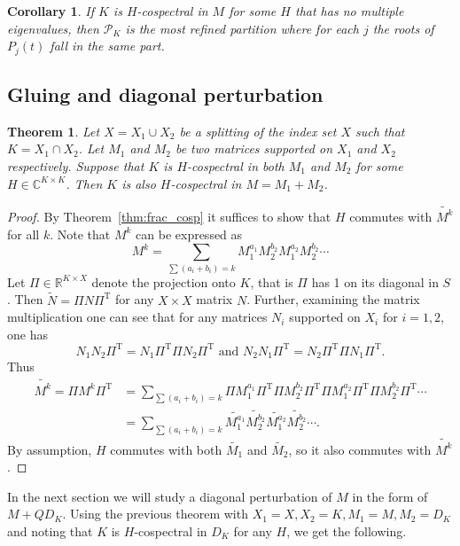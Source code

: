 \documentclass[11pt]{article}
\newtheorem{theorem}[theo]{Theorem}
\newtheorem{coro}[theo]{Corollary}
\theoremstyle{definition}
\numberwithin{equation}{section}
\newcommand{\PK}[1][K]{\mathcal{P}_{#1}}
\newcommand\+{\mkern2mu}
\newcommand{\R}{\mathbb{R}}
\newcommand{\C}{\mathbb{C}}
\newcommand{\1}{\mathbf 1}
\newcommand{\tr}{\mathrm{T}}
\begin{document}
\begin{coro}
If $K$ is $H$-cospectral in $M$ for some $H$ that has no multiple eigenvalues, then $\PK$ is the most refined partition where for each $j$ the roots of $P_
j(t)$ fall in the same part.
\end{coro}


\subsection{Gluing and diagonal perturbation}


\begin{theorem}\label{thm:gluing}
Let $X = X_1 \cup X_2$ be a splitting of the index set $X$ such that $K = X_1 \cap X_2$. Let $M_1$ and $M_2$ be two matrices supported on $X_1$ and $X_2$ respectively. Suppose that $K$ is $H$-cospectral in both $M_1$ and $M_2$ for some $H \in \C^{K \times K}$. Then $K$ is also $H$-cospectral in $M = M_1 + M_2$.
\end{theorem}

\begin{proof} By Theorem~\ref{thm:frac_cosp} it suffices to show that $H$ commutes with $\widetilde{M^k}$ for all $k$. Note that $M^k$ can be expressed as
\[
M^k = \sum_{\sum(a_i+b_i)=k} M_1^{a_1}M_2^{b_2} M_1^{a_2} M_2^{b_2}\cdots
\]
Let $\Pi \in \R^{K \times X}$ denote the projection onto $K$, that is $\Pi$ has 1 on its diagonal in $S$. Then $\tilde{N} = \Pi N \Pi^{\tr}$ for any $X\times X$ matrix $N$. Further,  examining the matrix multiplication one can see that for any matrices $N_i$ supported on $X_i$ for  $i = 1,2$, one has 
\[
N_1 N_2 \Pi^{\tr} = N_1 \Pi^{\tr} \Pi N_2 \Pi^{\tr} \mbox{ and } N_2 N_1 \Pi^{\tr} = N_2 \Pi^{\tr} \Pi N_1 \Pi^{\tr}.
\]
Thus
\begin{align*}
\widetilde{M^k} = \Pi M^k\Pi^{\tr} &= \sum_{\sum(a_i+b_i)=k} \Pi M_1^{a_1}\Pi^{\tr} \Pi  M_2^{b_2}\Pi^{\tr} \Pi M_1^{a_2}\Pi^{\tr} \Pi  M_2^{b_2}\Pi^{\tr} \cdots \\
&=  \sum_{\sum(a_i+b_i)=k} \widetilde{M_1^{a_1}}\widetilde{ M_2^{b_2}}\widetilde{M_1^{a_2}}\widetilde{M_2^{b_2}}\cdots.
\end{align*}
By assumption, $H$ commutes with both $\widetilde{M_1}$ and $\widetilde{M_2}$, so it also commutes with $\widetilde{M^k}$.
\end{proof}

In the next section we will study a diagonal perturbation of $M$ in the form of $M + Q D_K$. Using the previous theorem with $X_1 = X, X_2 = K, M_1 = M, M_2 = D_K$ and noting that $K$ is $H$-cospectral in $D_K$ for any $H$, we get the following.
\end{document}
